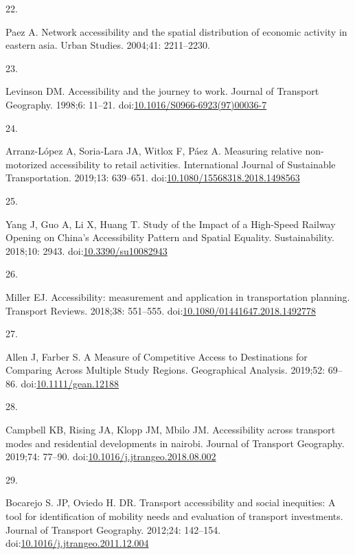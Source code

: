 \documentclass[10pt,letterpaper]{article}
\newlength{\cslhangindent}
\newlength{\csllabelwidth}
\newlength{\cslentryspacingunit} %
\newenvironment{CSLReferences}[2] %
 {%
  \setlength{\parindent}{0pt}
  \ifodd #1
  \let\oldpar\par
  \def\par{\hangindent=\cslhangindent\oldpar}
  \fi
  \setlength{\parskip}{#2\cslentryspacingunit}
 }%
 {}
\newcommand{\CSLLeftMargin}[1]{\parbox[t]{\csllabelwidth}{#1}}
\newcommand{\CSLRightInline}[1]{\parbox[t]{\linewidth - \csllabelwidth}{#1}\break}
\begin{document}
\begin{CSLReferences}{0}{0}
\leavevmode{}%
\CSLLeftMargin{22. }%
\CSLRightInline{Paez A. Network accessibility and the spatial
distribution of economic activity in eastern asia. Urban Studies.
2004;41: 2211--2230. }

\leavevmode{}%
\CSLLeftMargin{23. }%
\CSLRightInline{Levinson DM. Accessibility and the journey to work.
Journal of Transport Geography. 1998;6: 11--21.
doi:\href{https://doi.org/10.1016/S0966-6923(97)00036-7}{10.1016/S0966-6923(97)00036-7}}

\leavevmode{}%
\CSLLeftMargin{24. }%
\CSLRightInline{Arranz-López A, Soria-Lara JA, Witlox F, Páez A.
Measuring relative non-motorized accessibility to retail activities.
International Journal of Sustainable Transportation. 2019;13: 639--651.
doi:\href{https://doi.org/10.1080/15568318.2018.1498563}{10.1080/15568318.2018.1498563}}

\leavevmode{}%
\CSLLeftMargin{25. }%
\CSLRightInline{Yang J, Guo A, Li X, Huang T. Study of the {Impact} of a
{High-Speed Railway Opening} on {China}'s {Accessibility Pattern} and
{Spatial Equality}. Sustainability. 2018;10: 2943.
doi:\href{https://doi.org/10.3390/su10082943}{10.3390/su10082943}}

\leavevmode{}%
\CSLLeftMargin{26. }%
\CSLRightInline{Miller EJ. Accessibility: measurement and application in
transportation planning. Transport Reviews. 2018;38: 551--555.
doi:\href{https://doi.org/10.1080/01441647.2018.1492778}{10.1080/01441647.2018.1492778}}

\leavevmode{}%
\CSLLeftMargin{27. }%
\CSLRightInline{Allen J, Farber S. A Measure of Competitive Access to
Destinations for Comparing Across Multiple Study Regions. Geographical
Analysis. 2019;52: 69--86.
doi:\href{https://doi.org/10.1111/gean.12188}{10.1111/gean.12188}}

\leavevmode{}%
\CSLLeftMargin{28. }%
\CSLRightInline{Campbell KB, Rising JA, Klopp JM, Mbilo JM.
Accessibility across transport modes and residential developments in
nairobi. Journal of Transport Geography. 2019;74: 77--90.
doi:\href{https://doi.org/10.1016/j.jtrangeo.2018.08.002}{10.1016/j.jtrangeo.2018.08.002}}

\leavevmode{}%
\CSLLeftMargin{29. }%
\CSLRightInline{Bocarejo S. JP, Oviedo H. DR. Transport accessibility
and social inequities: A tool for identification of mobility needs and
evaluation of transport investments. Journal of Transport Geography.
2012;24: 142--154.
doi:\href{https://doi.org/10.1016/j.jtrangeo.2011.12.004}{10.1016/j.jtrangeo.2011.12.004}}


\end{CSLReferences}
\end{document}
